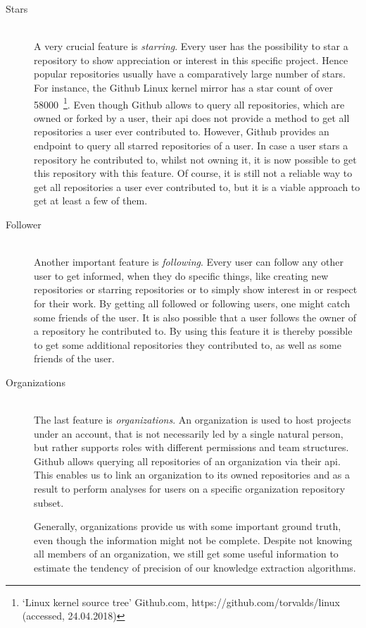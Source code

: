 \begin{description}
    \item[Stars] \hfill \\
        A very crucial feature is \emph{starring}. Every user has the possibility to star a repository to show appreciation or interest in this specific project.
        Hence popular repositories usually have a comparatively large number of stars. For instance, the Github Linux kernel mirror has a star count of over 58000~\footnote{`Linux kernel source tree' Github.com, https://github.com/torvalds/linux (accessed, 24.04.2018)}.
        Even though Github allows to query all repositories, which are owned or forked by a user, their \ac{api} does not provide a method to get all repositories a user ever contributed to.
        However, Github provides an endpoint to query all starred repositories of a user.
        In case a user stars a repository he contributed to, whilst not owning it, it is now possible to get this repository with this feature.
        Of course, it is still not a reliable way to get all repositories a user ever contributed to, but it is a viable approach to get at least a few of them.

    \item[Follower] \hfill \\
        Another important feature is \emph{following}.
        Every user can follow any other user to get informed, when they do specific things, like creating new repositories or starring repositories or to simply show interest in or respect for their work.
        By getting all followed or following users, one might catch some friends of the user.
        It is also possible that a user follows the owner of a repository he contributed to.
        By using this feature it is thereby possible to get some additional repositories they contributed to, as well as some friends of the user.

    \item[Organizations] \hfill \\
        The last feature is \emph{organizations}.
        An organization is used to host projects under an account, that is not necessarily led by a single natural person, but rather supports roles with different permissions and team structures.
        Github allows querying all repositories of an organization via their \ac{api}.
        This enables us to link an organization to its owned repositories and as a result to perform analyses for users on a specific organization repository subset.

        Generally, organizations provide us with some important ground truth, even though the information might not be complete.
        Despite not knowing all members of an organization, we still get some useful information to estimate the tendency of precision of our knowledge extraction algorithms.
\end{description}
